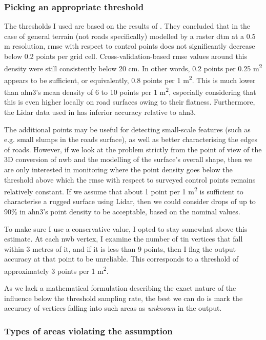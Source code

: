 \subsubsection{Picking an appropriate threshold}

The thresholds I used are based on the results of \cite{guo_etal_2010}. They concluded that in the case of general terrain (not roads specifically) modelled by a raster \ac{dtm} at a 0.5 m resolution, \ac{rmse} with respect to control points does not significantly decrease below 0.2 points per grid cell. Cross-validation-based \ac{rmse} values around this density were still consistently below 20 cm. In other words, 0.2 points per 0.25 m\textsuperscript{2} appears to be sufficient, or equivalently, 0.8 points per 1 m\textsuperscript{2}. This is much lower than \ac{ahn3}'s mean density of 6 to 10 points per 1 m\textsuperscript{2}, especially considering that this is even higher locally on road surfaces owing to their flatness. Furthermore, the Lidar data used in \cite{guo_etal_2010} has inferior accuracy relative to \ac{ahn3}.

The additional points may be useful for detecting small-scale features (such as e.g. small slumps in the roads surface), as well as better characterising the edges of roads. However, if we look at the problem strictly from the point of view of the 3D conversion of \ac{nwb} and the modelling of the surface's overall shape, then we are only interested in monitoring where the point density goes below the threshold above which the \ac{rmse} with respect to surveyed control points remains relatively constant. If we assume that about 1 point per 1 m\textsuperscript{2} is sufficient to characterise a rugged surface using Lidar, then we could consider drops of up to 90\% in \ac{ahn3}'s point density to be acceptable, based on the nominal values.

To make sure I use a conservative value, I opted to stay somewhat above this estimate. At each \ac{nwb} vertex, I examine the number of \ac{tin} vertices that fall within 3 metres of it, and if it is less than 9 points, then I flag the output accuracy at that point to be unreliable. This corresponds to a threshold of approximately 3 points per 1 m\textsuperscript{2}.

As we lack a mathematical formulation describing the exact nature of the influence below the threshold sampling rate, the best we can do is mark the accuracy of vertices falling into such areas as \textit{unknown} in the output.

\subsubsection{Types of areas violating the assumption}

